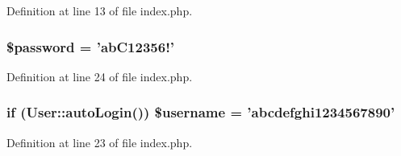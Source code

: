 Definition at line 13 of file index.\-php.

\hypertarget{index_8php_a607686ef9f99ea7c42f4f3dd3dbb2b0d}{
\subsubsection[{\$password}]{\setlength{\rightskip}{0pt plus 5cm}\$password = 'ab\-C12356!'}}\label{index_8php_a607686ef9f99ea7c42f4f3dd3dbb2b0d}


Definition at line 24 of file index.\-php.

\hypertarget{index_8php_a658cbc82540a98b3564f370b127616c3}{
\subsubsection[{\$username}]{\setlength{\rightskip}{0pt plus 5cm}if (User\-::auto\-Login()) \$username = 'abcdefghi1234567890'}}\label{index_8php_a658cbc82540a98b3564f370b127616c3}


Definition at line 23 of file index.\-php.

